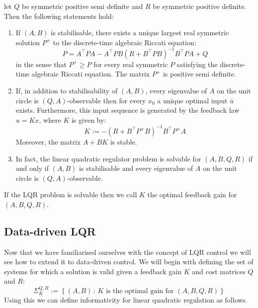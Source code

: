 {
	let $Q$ be symmetric positive semi definite and $R$ be symmetric positive definite. Then the following statements hold:
	\begin{enumerate}
		\item If $(A,B)$ is stabilisable, there exists a unique largest real symmetric solution $P^+$ to the discrete-time algebraic Riccati equation:
		\begin{equation} \label{DARE}
			P = A^\top P A - A^\top P B (R+B^\top PB)^{-1} B^\top P A + Q
		\end{equation}
		in the sense that $P^+ \geq P$ for every real symmetric $P$ satisfying the discrete-time algebraic Riccati equation. The matrix $P^+$ is positive semi definite.
		\item If, in addition to stabilisability of $(A,B)$, every eigenvalue of $A$ on the unit circle is $(Q,A)$-observable then for every $x_0$ a unique optimal input $\bar{u}$ exists. Furthermore, this input sequence is generated by the feedback law $u = Kx$, where $K$ is given by:
		\begin{equation} \label{LQRK}
			K := -(R+B^\top P^+ B)^{-1} B^\top P^+ A
		\end{equation}
		Moreover, the matrix $A + BK$ is stable.
		\item In fact, the linear quadratic regulator problem is solvable for $(A,B,Q,R)$ if and only if $(A,B)$ is stabilisable and every eigenvalue of $A$ on the unit circle is $(Q,A)$-observable.
	\end{enumerate}
}
If the LQR problem is solvable then we call $K$ the optimal feedback gain for $(A,B,Q,R)$.

\subsection{Data-driven LQR}
Now that we have familiarised ourselves with the concept of LQR control we will see how to extend it to data-driven control. We will begin with defining the set of systems for which a solution is valid given a feedback gain $K$ and cost matrices $Q$ and $R$:
\[ \Sigma_K^{Q,R} := \left\{ (A,B) \, : \, K \mbox{ is the optimal gain for } (A,B,Q,R) \right\} \]
Using this we can define informativity for linear quadratic regulation as follows.


